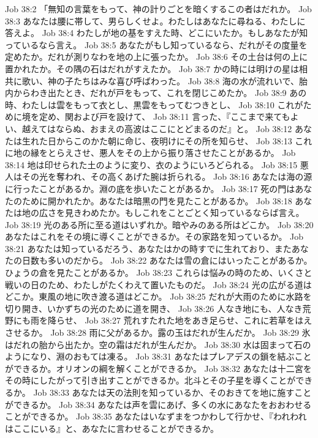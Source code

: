 Job 38:2  「無知の言葉をもって、神の計りごとを暗くするこの者はだれか。
Job 38:3  あなたは腰に帯して、男らしくせよ。わたしはあなたに尋ねる、わたしに答えよ。
Job 38:4  わたしが地の基をすえた時、どこにいたか。もしあなたが知っているなら言え。
Job 38:5  あなたがもし知っているなら、だれがその度量を定めたか。だれが測りなわを地の上に張ったか。
Job 38:6  その土台は何の上に置かれたか。その隅の石はだれがすえたか。
Job 38:7  かの時には明けの星は相共に歌い、神の子たちはみな喜び呼ばわった。
Job 38:8  海の水が流れいで、胎内からわき出たとき、だれが戸をもって、これを閉じこめたか。
Job 38:9  あの時、わたしは雲をもって衣とし、黒雲をもってむつきとし、
Job 38:10  これがために境を定め、関および戸を設けて、
Job 38:11  言った、『ここまで来てもよい、越えてはならぬ、おまえの高波はここにとどまるのだ』と。
Job 38:12  あなたは生れた日からこのかた朝に命じ、夜明けにその所を知らせ、
Job 38:13  これに地の縁をとらえさせ、悪人をその上から振り落させたことがあるか。
Job 38:14  地は印せられた土のように変り、衣のようにいろどられる。
Job 38:15  悪人はその光を奪われ、その高くあげた腕は折られる。
Job 38:16  あなたは海の源に行ったことがあるか。淵の底を歩いたことがあるか。
Job 38:17  死の門はあなたのために開かれたか。あなたは暗黒の門を見たことがあるか。
Job 38:18  あなたは地の広さを見きわめたか。もしこれをことごとく知っているならば言え。
Job 38:19  光のある所に至る道はいずれか。暗やみのある所はどこか。
Job 38:20  あなたはこれをその境に導くことができるか。その家路を知っているか。
Job 38:21  あなたは知っているだろう、あなたはかの時すでに生れており、またあなたの日数も多いのだから。
Job 38:22  あなたは雪の倉にはいったことがあるか。ひょうの倉を見たことがあるか。
Job 38:23  これらは悩みの時のため、いくさと戦いの日のため、わたしがたくわえて置いたものだ。
Job 38:24  光の広がる道はどこか。東風の地に吹き渡る道はどこか。
Job 38:25  だれが大雨のために水路を切り開き、いかずちの光のために道を開き、
Job 38:26  人なき地にも、人なき荒野にも雨を降らせ、
Job 38:27  荒れすたれた地をあき足らせ、これに若草をはえさせるか。
Job 38:28  雨に父があるか。露の玉はだれが生んだか。
Job 38:29  氷はだれの胎から出たか。空の霜はだれが生んだか。
Job 38:30  水は固まって石のようになり、淵のおもては凍る。
Job 38:31  あなたはプレアデスの鎖を結ぶことができるか。オリオンの綱を解くことができるか。
Job 38:32  あなたは十二宮をその時にしたがって引き出すことができるか。北斗とその子星を導くことができるか。
Job 38:33  あなたは天の法則を知っているか、そのおきてを地に施すことができるか。
Job 38:34  あなたは声を雲にあげ、多くの水にあなたをおおわせることができるか。
Job 38:35  あなたはいなずまをつかわして行かせ、『われわれはここにいる』と、あなたに言わせることができるか。
